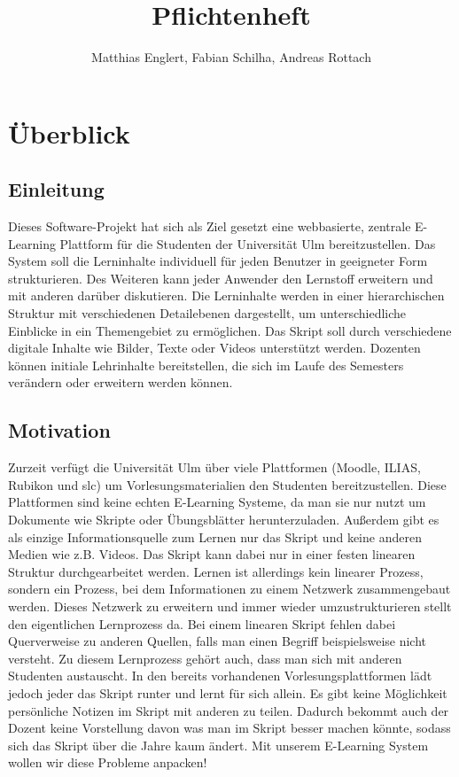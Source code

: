 \documentclass[12pt,a4paper]{article}
\author{Matthias Englert, Fabian Schilha, Andreas Rottach}
\title{Pflichtenheft}
\begin{document}
\maketitle
\newpage
\tableofcontents
\newpage
\section{Überblick}
\subsection{Einleitung}
Dieses Software-Projekt hat sich als Ziel gesetzt eine webbasierte, zentrale E-Learning Plattform für die Studenten der Universität Ulm bereitzustellen. Das System soll die Lerninhalte individuell für jeden Benutzer in geeigneter Form strukturieren. Des Weiteren kann jeder Anwender den Lernstoff erweitern und mit anderen darüber diskutieren. Die Lerninhalte werden in einer hierarchischen Struktur mit verschiedenen Detailebenen dargestellt, um unterschiedliche Einblicke in ein Themengebiet zu ermöglichen. Das Skript soll durch verschiedene digitale Inhalte wie Bilder, Texte oder Videos unterstützt werden. Dozenten können initiale Lehrinhalte bereitstellen, die sich im Laufe des Semesters verändern oder erweitern werden können.

\subsection{Motivation}
Zurzeit verfügt die Universität Ulm über viele Plattformen (Moodle, ILIAS, Rubikon und slc) um Vorlesungsmaterialien den Studenten bereitzustellen. Diese Plattformen sind keine echten E-Learning Systeme, da man sie nur nutzt um Dokumente wie Skripte oder Übungsblätter herunterzuladen. Außerdem gibt es als einzige Informationsquelle zum Lernen nur das Skript und keine anderen Medien wie z.B. Videos. Das Skript kann dabei nur in einer festen linearen Struktur durchgearbeitet werden. Lernen ist allerdings kein linearer Prozess, sondern ein Prozess, bei dem Informationen zu einem Netzwerk zusammengebaut werden. Dieses Netzwerk zu erweitern und immer wieder umzustrukturieren stellt den eigentlichen Lernprozess da. Bei einem linearen Skript fehlen dabei Querverweise zu anderen Quellen, falls man einen Begriff beispielsweise nicht versteht. Zu diesem Lernprozess gehört auch, dass man sich mit anderen Studenten austauscht. In den bereits vorhandenen Vorlesungsplattformen lädt jedoch jeder das Skript runter und lernt für sich allein. Es gibt keine Möglichkeit persönliche Notizen im Skript mit anderen zu teilen. Dadurch bekommt auch der Dozent keine Vorstellung davon was man im Skript besser machen könnte, sodass sich das Skript über die Jahre kaum ändert.
Mit unserem E-Learning System wollen wir diese Probleme anpacken! 
\end{document}
